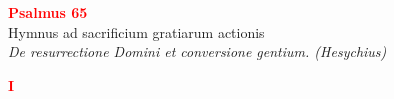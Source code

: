 


\def\greinitialformat#1{%
{\fontsize{39}{39}\selectfont #1}%
}




\vspace{0.3cm}
\begin{center}
 \textcolor{red}{\large \bf Psalmus 65}\\
Hymnus ad sacrificium gratiarum actionis\\
\textit{\small De resurrectione Domini et conversione gentium. (Hesychius)}
\end{center}
\begin{center}
\textcolor{red}{\bf I}
\end{center}
